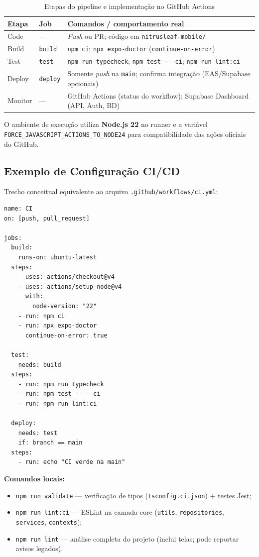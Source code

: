 \begin{table}[H]
\centering
\caption{Etapas do pipeline e implementação no GitHub Actions}
\label{tab:cicd-jobs}
\small
\begin{tabular}{|l|l|p{7.2cm}|}
\hline
\textbf{Etapa} & \textbf{Job} & \textbf{Comandos / comportamento real} \\
\hline
Code & --- & \textit{Push} ou PR; código em \texttt{nitrusleaf-mobile/} \\
\hline
Build & \texttt{build} & \texttt{npm ci}; \texttt{npx expo-doctor} (\texttt{continue-on-error}) \\
\hline
Test & \texttt{test} & \texttt{npm run typecheck}; \texttt{npm test -- --ci}; \texttt{npm run lint:ci} \\
\hline
Deploy & \texttt{deploy} & Somente \textit{push} na \texttt{main}; confirma integração (EAS/Supabase opcionais) \\
\hline
Monitor & --- & GitHub Actions (status do workflow); Supabase Dashboard (API, Auth, BD) \\
\hline
\end{tabular}
\end{table}

O ambiente de execução utiliza \textbf{Node.js 22} no runner e a variável \texttt{FORCE\_JAVASCRIPT\_ACTIONS\_TO\_NODE24} para compatibilidade das ações oficiais do GitHub.

\subsection{Exemplo de Configuração CI/CD}

Trecho conceitual equivalente ao arquivo \texttt{.github/workflows/ci.yml}:

\begin{verbatim}
name: CI
on: [push, pull_request]

jobs:
  build:
    runs-on: ubuntu-latest
  steps:
    - uses: actions/checkout@v4
    - uses: actions/setup-node@v4
      with:
        node-version: "22"
    - run: npm ci
    - run: npx expo-doctor
      continue-on-error: true

  test:
    needs: build
  steps:
    - run: npm run typecheck
    - run: npm test -- --ci
    - run: npm run lint:ci

  deploy:
    needs: test
    if: branch == main
  steps:
    - run: echo "CI verde na main"
\end{verbatim}

\textbf{Comandos locais:}
\begin{itemize}[leftmargin=*, nosep]
    \item \texttt{npm run validate} --- verificação de tipos (\texttt{tsconfig.ci.json}) + testes Jest;
    \item \texttt{npm run lint:ci} --- ESLint na camada core (\texttt{utils}, \texttt{repositories}, \texttt{services}, \texttt{contexts});
    \item \texttt{npm run lint} --- análise completa do projeto (inclui telas; pode reportar avisos legados).
\end{itemize}

